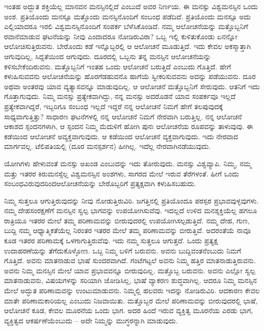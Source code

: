 ಇಂತಹ ಅದ್ಭುತ ಶಕ್ತಿಯೆಲ್ಲ ಮಾನವನ ಮನಸ್ಸಿನಲ್ಲಿದೆ ಎಂಬುದೆ ಅವರ ನಿರ್ಣಯ. ಈ ಮನಸ್ಸು ವಿಶ್ವಮನಸ್ಸಿನ ಒಂದು ಅಂಶ. ಪ್ರತಿಯೊಂದು ಮನಸ್ಸೂ ಮತ್ತೊಂದು ಮನಸ್ಸಿನೊಂದಿಗೆ ಸಂಬಂಧ ಪಡೆದಿದೆ. ಪ್ರತಿಯೊಂದು ಮನಸ್ಸೂ ಅದು ಎಲ್ಲಿಯಾದರೂ ಇರಲಿ ವಿಶ್ವಮನಸ್ಸಿನೊಂದಿಗೆ ಸಂಪರ್ಕ ಬೆಳೆಸಿಕೊಂಡಿದೆ. ನಮ್ಮ ಆಲೋಚನೆಯನ್ನು ಮತ್ತೊಬ್ಬನಿಗೆ ರವಾನೆಮಾಡುವ ಘಟನೆಯನ್ನು ನೀವು ಎಂದಾದರೂ ನೋಡಿರುವಿರಾ? ಒಬ್ಬ ಇಲ್ಲಿ ಕುಳಿತುಕೊಂಡು ಏನನ್ನೋ ಆಲೋಚಿಸುತ್ತಿರುವನು. ಬೇರೊಂದು ಕಡೆ ಇನ್ನೊಬ್ಬರಲ್ಲಿ ಆ ಆಲೋಚನೆ ಮೂಡುತ್ತಿದೆ. ಇದು ಕೇವಲ ಅಕಸ್ಮಾತ್ತಾಗಿ ಆಗುವುದಿಲ್ಲ, ಸಿದ್ದತೆಯಿಂದ ಆಗುವುದು. ದೂರದಲ್ಲಿ ಒಬ್ಬನು ತನ್ನ ಮನಸ್ಸಿನ ಆಲೋಚನೆಯನ್ನು ಕಳಿಸಬೇಕೆಂದಿರುವನು. ಮತ್ತೊಬ್ಬನಿಗೆ ಇಂತಹ ಒಂದು ಆಲೋಚನೆ ಬರುತ್ತಿದೆ ಎಂಬುದು ಗೊತ್ತಿದೆ. ಹೇಗೆ ಕಳುಹಿಸುವವನು ಆಲೋಚನೆಯನ್ನು ಹೊರಗೆಡಹುವನೊ ಹಾಗೆಯೆ ಸ್ವೀಕರಿಸುವವನು ಅದನ್ನು ಪಡೆಯುವನು. ದೂರ ಅಥವಾ ಅಂತರವು ಯಾವ ವ್ಯತ್ಯಾಸವನ್ನೂ ಮಾಡುವುದಿಲ್ಲ. ಆ ಆಲೋಚನೆ ಮತ್ತೊಬ್ಬನಿಗೆ ಸೇರುವುದು. ಆತನಿಗೆ ಇದು ಗೊತ್ತಾಗುವುದು. ನಿಮ್ಮ ಮನಸ್ಸು ಪ್ರತ್ಯೇಕವಾಗಿದ್ದು, ನನ್ನ ಮನಸ್ಸು ಅದರೊಡನೆ ಯಾವ ಸಂಪರ್ಕವೂ ಇಲ್ಲದೆ ಪ್ರತ್ಯೇಕವಾಗಿದ್ದರೆ, ಇಬ್ಬರಿಗೂ ಸಂಬಂಧ ಇಲ್ಲದೆ ಇದ್ದರೆ ನನ್ನ ಆಲೋಚನೆ ನಿಮಗೆ ಹೇಗೆ ತಲಪುವುದಕ್ಕೆ ಸಾಧ್ಯವಾಗುತ್ತಿತ್ತು? ಸಾಧಾರಣ ಘಟನೆಗಳಲ್ಲಿ ನನ್ನ ಆಲೋಚನೆ ನಿಮಗೆ ನೇರವಾಗಿ ಬರುತ್ತಿಲ್ಲ. ನನ್ನ ಆಲೋಚನೆ ಆಕಾಶದ ಸ್ಪಂದನಗಳಾಗಿ, ಆ ಸ್ಪಂದನ ನಿಮ್ಮ ಮೆದುಳಿಗೆ ಹೋಗಿ ಪುನಃ ಆಲೋಚನೆಯ ರೂಪವನ್ನು ತಾಳುವುವು. ಈ ಕಡೆಯಿಂದ ಆಲೋಚನೆ ಅವ್ಯಕ್ತವಾಗುವುದು. ಆ ಕಡೆಯಿಂದ ಆಲೋಚನೆ ವ್ಯಕ್ತವಾಗುವುದು. ಇದು ನೇರವಾದ ಮಾರ್ಗವಲ್ಲ. ಟೆಲಿಪತಿಯಲ್ಲಿ (ದೂರ ಮನಸ್ಪರ್ಶನ) ಹೀಗಿಲ್ಲ. ಇದೆಲ್ಲ ನೇರವಾಗಿ\break ನಡೆಯುವುದು.

ಯೋಗಿಗಳು ಹೇಳುವಂತೆ ಮನಸ್ಸು ಅಖಂಡ ಎಂಬುದನ್ನು ಇದು ತೋರುವುದು. ಮನಸ್ಸು ವಿಶ್ವವ್ಯಾಪಿ. ನಿಮ್ಮ, ನಮ್ಮ ಮತ್ತು ಇತರರ ಕಿರುಮನಸ್ಸೆಲ್ಲ ವಿಶ್ವಮನಸ್ಸಿನ ಅಂಶಗಳು, ಸಾಗರದ ಮೇಲೆ ಇರುವ ತೆರೆಗಳಂತೆ. ಹೀಗೆ ಒಂದು ಸಂಬಂಧವಿರುವುದರಿಂದ\break ಆಲೋಚನೆಯನ್ನು ಬೇರೊಬ್ಬರಿಗೆ ಪ್ರತ್ಯಕ್ಷವಾಗಿ ಕಳುಹಿಸಬಹುದು.

ನಿಮ್ಮ ಸುತ್ತಲೂ ಆಗುತ್ತಿರುವುದನ್ನು ನೀವು ನೋಡುತ್ತಿರುವಿರಿ. ಜಗತ್ತಿನಲ್ಲಿ ಪ್ರತಿಯೊಂದೂ ಪರಸ್ಪರ ಪ್ರಭಾವವುಳ್ಳವುಗಳು. ನಮ್ಮ ದೇಹಸಂರಕ್ಷಣೆಗೆ ಮನಸ್ಸಿನ ಸ್ವಲ್ಪ ಭಾಗವನ್ನು ಉಪಯೋಗಿಸುವೆವು. ಇದಲ್ಲದೆ ಉಳಿದ ಮನಶ್ಶಕ್ತಿಯೆಲ್ಲ ಹಗಲೂ ರಾತ್ರಿಯೂ ಇತರರ ಮೇಲೆ ತಮ್ಮ ಪರಿಣಾಮವನ್ನು ಬೀರುವುದರಲ್ಲಿ ಉಪಯೋಗಿಸಲ್ಪಡುತ್ತಿದೆ. ನಮ್ಮ ದೇಹ, ಗುಣ, ಬುದ್ದಿ ನಮ್ಮ ಆಧ್ಯಾತ್ಮಿಕತೆಯೆಲ್ಲ ನಿರಂತರ ಇತರರ ಮೇಲೆ ತಮ್ಮ ಪರಿಣಾಮವನ್ನು ಬೀರುತ್ತಿವೆ. ಅದರಂತೆಯೆ ನಾವೂ ಕೂಡ ಇತರರ ಪರಿಣಾಮಕ್ಕೆ ಒಳಗಾಗುತ್ತಿರುವೆವು. ಇದು ನಮ್ಮ ಸುತ್ತಲೂ ಆಗುತ್ತದೆ. ಒಂದು ಪ್ರತ್ಯಕ್ಷ ಉದಾಹರಣೆಯನ್ನು ತೆಗೆದುಕೊಳ್ಳೋಣ. ಒಬ್ಬ ನಿಮ್ಮ ಬಳಿಗೆ ಬರುವನು. ಅವನು ಬುದ್ದಿವಂತನೆಂಬುದು ನಿಮಗೆ ಗೊತ್ತಿದೆ. ಅವನು ಮಾತನಾಡುವ ಭಾಷೆ ಸುಂದರವಾಗಿದೆ. ಗಂಟೆಗಟ್ಟಲೆ ಅವನು ನಿಮ್ಮ ಹತ್ತಿರ ಮಾತನಾಡುತ್ತಿರುವನು. ಅವನು ನಿಮ್ಮ ಮನಸ್ಸಿನ ಮೇಲೆ ಯಾವ ಪ್ರಭಾವವನ್ನೂ ಬೀರುವುದಿಲ್ಲ. ಮತ್ತೊಬ್ಬ ಬರುವನು. ಅವನು ಎಲ್ಲೋ ಸ್ವಲ್ಪ ಮಾತನಾಡುವನು, ವಿಷಯಗಳನ್ನು ಸರಿಯಾಗಿ ಜೋಡಿಸಿಲ್ಲ, ಭಾಷೆ ವ್ಯಾಕರಣ ಶುದ್ಧವಾಗಿಲ್ಲ. ಆದರೂ ನಿಮ್ಮ ಮನಸ್ಸಿನ ಮೇಲೆ ಅದ್ಭುತ ಪರಿಣಾಮವನ್ನು ಉಂಟುಮಾಡುವನು. ನಿಮ್ಮಲ್ಲಿ ಹಲವರು ಇದನ್ನು ನೋಡಿರುವಿರಿ. ಆದಕಾರಣ ಕೇವಲ ಮಾತೇ ಪರಿಣಾಮಕಾರಿಯಲ್ಲ ಎಂಬುದು ನಿಜವಾಯಿತು. ಮತ್ತೊಬ್ಬರ ಮೇಲೆ ಪರಿಣಾಮವನ್ನು ಬೀರುವುದರಲ್ಲಿ ಭಾಷೆ, ಆಲೋಚನೆ ಕೂಡ, ಕೇವಲ ಮೂರನೆಯ ಒಂದು ಭಾಗ. ಅದರ ಹಿಂದೆ ಇರುವ ವ್ಯಕ್ತಿತ್ವ ಮೂರನೆಯ ಎರಡು ಭಾಗ, ವ್ಯಕ್ತಿತ್ವದ ಆಕರ್ಷಣೆಯೆಂಬುದು – ಅದೇ ನಿಮ್ಮನ್ನು ಮುಗ್ಧರನ್ನಾಗಿ ಮಾಡುವುದು.

